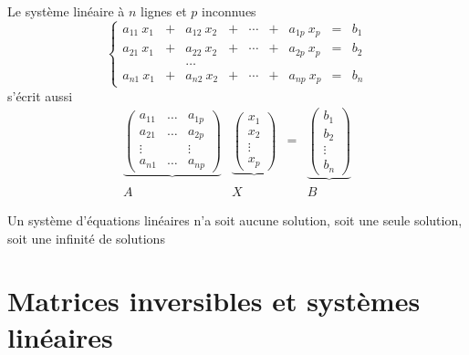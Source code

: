 \begin{frame}
Le système linéaire à $n$ lignes et $p$ inconnues
\[ \left\{ 
\begin{array}{ccccccccc}
a_{11} \  x_1 &+& a_{12}\  x_2 &+& \cdots &+& a_{1p}\  x_p & = & b_1\\
a_{21}\  x_1 &+& a_{22}\  x_2 &+& \cdots &+& a_{2p}\  x_p & = & b_2\\
&&\dots  && &&\\
a_{n1}\  x_1 &+& a_{n2}\  x_2 &+& \cdots &+& a_{np}\  x_p & = & b_n
\end{array} \right.
\]
\pause
s'écrit aussi
\begin{equation*}\begin{array}{cccc}
\underbrace{
\left(
\begin{array}{ccc}
a_{11} & \dots & a_{1p}\\
a_{21} & \dots & a_{2p}\\
\vdots &&\vdots\\
a_{n1} &\dots & a_{np}
\end{array}
\right)
}
&
\underbrace{
\left(
\begin{array}{c}
x_1\\
x_2\\
\vdots\\
x_p
\end{array}
\right)
}
& = &
\underbrace{
\left(
\begin{array}{c}
b_1\\
b_2\\
\vdots\\
b_n
\end{array}
\right)
}
\\
A & X & &B
\end{array}\end{equation*}

\pause

\begin{theoreme}
Un système d'équations linéaires n'a soit aucune solution, 
soit une seule solution, soit une infinité de solutions
\end{theoreme}

\end{frame}

\section{Matrices inversibles et systèmes linéaires}



